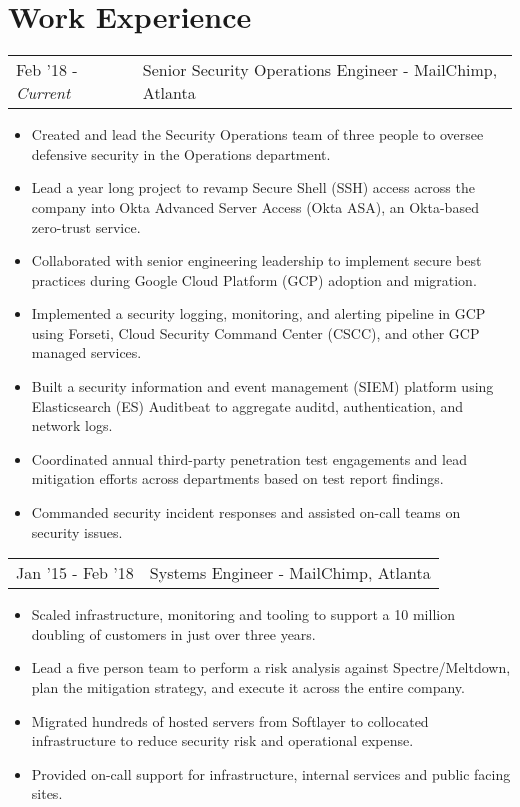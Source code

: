 \documentclass[letterpaper]{article}
\begin{document}
\section*{Work Experience}
\begin{tabular}{l|l}
{Feb '18 - \emph{Current}} & Senior Security Operations Engineer - MailChimp, Atlanta\\
\end{tabular}
\begin{itemize}[itemsep=0.5pt]
	\item Created and lead the Security Operations team of three people to oversee defensive security in the Operations department.
	\item Lead a year long project to revamp Secure Shell (SSH) access across the company into Okta Advanced Server Access (Okta ASA), an Okta-based zero-trust service. 
	\item Collaborated with senior engineering leadership to implement secure best practices during Google Cloud Platform (GCP) adoption and migration.
	\item Implemented a security logging, monitoring, and alerting pipeline in GCP using Forseti, Cloud Security Command Center (CSCC), and other GCP managed services.
	\item Built a security information and event management (SIEM) platform using Elasticsearch (ES) Auditbeat to aggregate auditd, authentication, and network logs.
	\item Coordinated annual third-party penetration test engagements and lead mitigation efforts across departments based on test report findings.
	\item Commanded security incident responses and assisted on-call teams on security issues.
\end{itemize}
\begin{tabular}{l|l}
{Jan '15 - Feb '18} & Systems Engineer - MailChimp, Atlanta\\
\end{tabular}
\begin{itemize}[itemsep=0.5pt]
	\item Scaled infrastructure, monitoring and tooling to support a 10 million doubling of customers in just over three years.
	\item Lead a five person team to perform a risk analysis against Spectre/Meltdown, plan the mitigation strategy, and execute it across the entire company.
	\item Migrated hundreds of hosted servers from Softlayer to collocated infrastructure to reduce security risk and operational expense.
	\item Provided on-call support for infrastructure, internal services and public facing sites.
\end{itemize}
\end{document}
